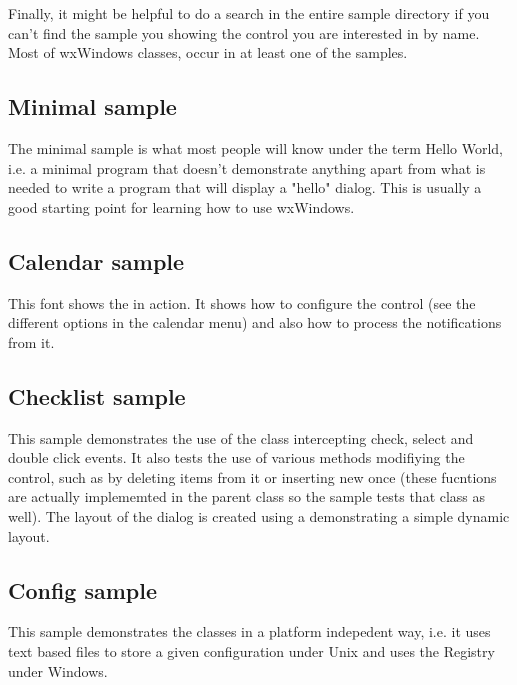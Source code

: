 Finally, it might be helpful to do a search in the entire sample directory if
you can't find the sample you showing the control you are interested in by
name. Most of wxWindows classes, occur in at least one of the samples.

\subsection{Minimal sample}\label{sampleminimal}

The minimal sample is what most people will know under the term Hello World,
i.e. a minimal program that doesn't demonstrate anything apart from what is
needed to write a program that will display a "hello" dialog. This is usually
a good starting point for learning how to use wxWindows.

\subsection{Calendar sample}\label{samplecalendar}

This font shows the  in action. It
shows how to configure the control (see the different options in the calendar
menu) and also how to process the notifications from it.

\subsection{Checklist sample}\label{samplechecklist}

This sample demonstrates the use of the 
class intercepting check, select and double click events. It also tests the
use of various methods modifiying the control, such as by deleting items
from it or inserting new once (these fucntions are actually implememted in
the parent class  so the sample tests that class
as well). The layout of the dialog is created using a 
demonstrating a simple dynamic layout.

\subsection{Config sample}\label{sampleconfig}

This sample demonstrates the  classes in a platform
indepedent way, i.e. it uses text based files to store a given configuration under
Unix and uses the Registry under Windows.

